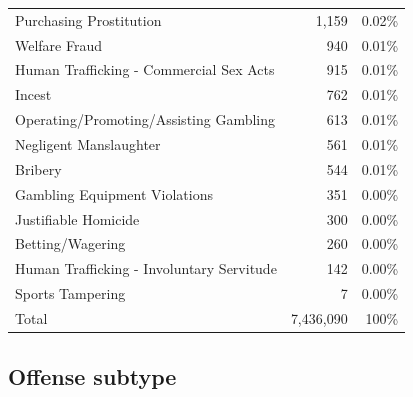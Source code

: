 \documentclass[
  12pt,
  openany]{book}
\begin{document}
\begin{longtable}[]{@{}lrr@{}}
Purchasing Prostitution & 1,159 & 0.02\%\tabularnewline
Welfare Fraud & 940 & 0.01\%\tabularnewline
Human Trafficking - Commercial Sex Acts & 915 & 0.01\%\tabularnewline
Incest & 762 & 0.01\%\tabularnewline
Operating/Promoting/Assisting Gambling & 613 & 0.01\%\tabularnewline
Negligent Manslaughter & 561 & 0.01\%\tabularnewline
Bribery & 544 & 0.01\%\tabularnewline
Gambling Equipment Violations & 351 & 0.00\%\tabularnewline
Justifiable Homicide & 300 & 0.00\%\tabularnewline
Betting/Wagering & 260 & 0.00\%\tabularnewline
Human Trafficking - Involuntary Servitude & 142 & 0.00\%\tabularnewline
Sports Tampering & 7 & 0.00\%\tabularnewline
Total & 7,436,090 & 100\%\tabularnewline
\bottomrule
\end{longtable}

\hypertarget{offense-subtype}{%
\subsection{Offense subtype}\label{offense-subtype}}
\end{document}
